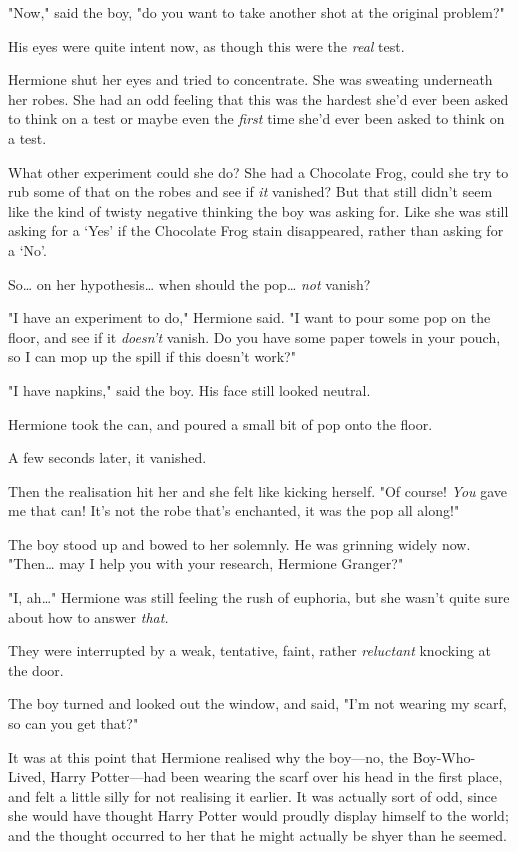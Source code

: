 "Now," said the boy, "do you want to take another shot at the original problem?"

His eyes were quite intent now, as though this were the \emph{real} test.

Hermione shut her eyes and tried to concentrate. She was sweating underneath 
her robes. She had an odd feeling that this was the hardest she'd ever been 
asked to think on a test or maybe even the \emph{first} time she'd ever been 
asked to think on a test.

What other experiment could she do? She had a Chocolate Frog, could she try to 
rub some of that on the robes and see if \emph{it} vanished? But that still 
didn't seem like the kind of twisty negative thinking the boy was asking for. 
Like she was still asking for a `Yes' if the Chocolate Frog stain disappeared, 
rather than asking for a `No'.

So{\ldots} on her hypothesis{\ldots} when should the pop{\ldots} \emph{not} 
vanish?

"I have an experiment to do," Hermione said. "I want to pour some pop on the 
floor, and see if it \emph{doesn't} vanish. Do you have some paper towels in 
your pouch, so I can mop up the spill if this doesn't work?"

"I have napkins," said the boy. His face still looked neutral.

Hermione took the can, and poured a small bit of pop onto the floor.

A few seconds later, it vanished.

Then the realisation hit her and she felt like kicking herself. "Of course! 
\emph{You} gave me that can! It's not the robe that's enchanted, it was the pop 
all along!"

The boy stood up and bowed to her solemnly. He was grinning widely now. 
"Then{\ldots} may I help you with your research, Hermione Granger?"

"I, ah{\ldots}" Hermione was still feeling the rush of euphoria, but she wasn't 
quite sure about how to answer \emph{that.}

They were interrupted by a weak, tentative, faint, rather \emph{reluctant} 
knocking at the door.

The boy turned and looked out the window, and said, "I'm not wearing my scarf, 
so can you get that?"

It was at this point that Hermione realised why the boy---no, the 
Boy-Who-Lived, Harry Potter---had been wearing the scarf over his head in the 
first place, and felt a little silly for not realising it earlier. It was 
actually sort of odd, since she would have thought Harry Potter would proudly 
display himself to the world; and the thought occurred to her that he might 
actually be shyer than he seemed.

